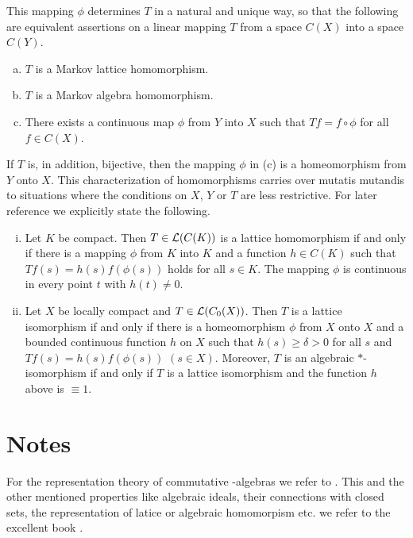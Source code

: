 This mapping $\phi$ determines $T$ in a natural and unique way, so that the following are equivalent assertions on a linear mapping $T$ from a space $C(X)$ into a space $C(Y)$.
\begin{enumerate}[(a)]
\item 
	$T$ is a Markov lattice homomorphism.
\item 
	$T$ is a Markov algebra homomorphism.
\item 
	There exists a continuous map $\phi$ from $Y$ into $X$ such that $Tf = f \circ \phi$ for all $f \in 	C(X)$.
\end{enumerate}
If $T$ is, in addition, bijective, then the mapping $\phi$ in (c) is a homeomorphism from $Y$ onto $X$.
This characterization of homomorphisms carries over mutatis mutandis to situations where the conditions on $X$, $Y$ or $T$ are less restrictive.
For later reference we explicitly state the following.
\begin{enumerate}[(i)]
\item 
	Let $K$ be compact. Then $ T \in \mathcal{L}(C(K)) $ is a lattice homomorphism if and only if there is a mapping 
$\phi$ from $K$ into $K$ and a function $h \in C(K)$ such that $Tf(s) = h(s)f(\phi(s))$ holds for all $s \in K$.
The mapping $\phi$ is continuous in every point $t$ with $h(t) \neq 0$.

\item 
	Let $X$ be locally compact and $T \in \mathcal{L}(C_{0}(X))$.
Then $T$ is a lattice isomorphism if and only if there is a homeomorphism $\phi$ from $X$ onto $X$ and a bounded continuous function $h$ on $X$ such that $h(s) \geq \delta > 0$ for all $s$ and $Tf(s) = h(s)f(\phi(s))$ $(s \in X)$.
Moreover, $T$ is an algebraic $*$-isomorphism if and only if $T$ is a lattice isomorphism and the function $h$ above is $\equiv 1$.
\end{enumerate}

\section*{Notes}

For the representation theory of commutative \CA-algebras we refer to \citet{takesaki:1979}. 
This and the other mentioned properties like algebraic ideals, their connections with closed sets, the representation of latice or algebraic homomorpism etc. we refer to the excellent book \citet{semadeni:1971}.


\RaggedRight

 

